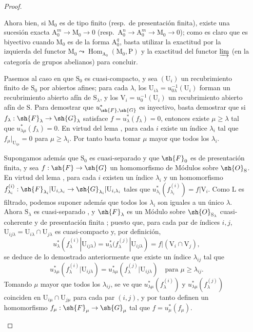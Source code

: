 \begin{proof}
\begin{enumerate}[label=(\roman*)]
Ahora bien, si $\mathrm{M}_0$ es de tipo finito (resp.\ de presentación finita), existe una sucesión exacta $\mathrm{A}_0^m\to\mathrm{M}_0\to 0$ (resp.\ $\mathrm{A}_0^n\to\mathrm{A}_0^m\to\mathrm{M}_0\to 0$); como es claro que  es biyectivo cuando $\mathrm{M}_0$ es de la forma $\mathrm{A}_0^q$, basta utilizar la exactitud por la izquierda del functor $\mathrm{M}_0\leadsto\operatorname{Hom}_{\mathrm{A}_0}(\mathrm{M}_0,\mathrm{P})$ y la exactitud del functor $\varinjlim$ (en la categoría de grupos abelianos) para concluir.

\medskip
Pasemos al caso en que $\mathrm{S}_0$ es cuasi-compacto, y sea $(\mathrm{U}_i)$ un recubrimiento finito de $\mathrm{S}_0$ por abiertos afines; para cada $\lambda$, los $\mathrm{U}_{i\lambda}=u_{0\lambda}^{-1}(\mathrm{U}_i)$ forman un recubrimiento abierto afín de $\mathrm{S}_\lambda$, y los $\mathrm{V}_i=u_0^{-1}(\mathrm{U}_i)$ un recubrimiento abierto afín de $\mathrm{S}$.
Para demostrar que $u_{\sh{F},\sh{G}}^*$ es inyectivo, basta demostrar que si $f_\lambda:\sh{F}_\lambda\to\sh{G}_\lambda$ satisface $f=u_\lambda^*(f_\lambda)=0$, entonces existe $\mu\geqslant\lambda$ tal que $u_{\lambda\mu}^*(f_\lambda)=0$.
En virtud del lema , para cada $i$ existe un índice $\lambda_i$ tal que $f_\mu|_{\mathrm{U}_{i\mu}}=0$ para $\mu\geqslant\lambda_i$.
Por tanto basta tomar $\mu$ mayor que todos los $\lambda_i$.

Supongamos además que $\mathrm{S}_0$ es cuasi-separado y que $\sh{F}_0$ es de presentación finita, y sea $f:\sh{F}\to\sh{G}$ un homomorfismo de Módulos sobre $\sh{O}_\mathrm{S}$.
En virtud del lema , para cada $i$ existen un índice $\lambda_i$ y un homomorfismo $f_{\lambda_i}^{(i)}:\sh{F}_{\lambda_i}|\mathrm{U}_{i,\lambda_i}\to\sh{G}_{\lambda_i}|\mathrm{U}_{i,\lambda_i}$ tales que $u_{\lambda_i}^*(f_{\lambda_i}^{(i)})=f|\mathrm{V}_i$.
Como $\mathrm{L}$ es filtrado, podemos suponer además que todos los $\lambda_i$ son iguales a un único $\lambda$.
Ahora $\mathrm{S}_\lambda$ es cuasi-separado , y $\sh{F}_\lambda$ es un Módulo sobre $\sh{O}_{\mathrm{S}_\lambda}$ cuasi-coherente y de presentación finita ; puesto que, para cada par de índices $i,j$, $\mathrm{U}_{ij\lambda}=\mathrm{U}_{i\lambda}\cap\mathrm{U}_{j\lambda}$ es cuasi-compacto y, por definición,
\[
  u_\lambda^*(f_\lambda^{(i)}|\mathrm{U}_{ij\lambda})=u_\lambda^*(f_\lambda^{(j)}|\mathrm{U}_{ij\lambda})=f|(\mathrm{V}_i\cap\mathrm{V}_j),
\]
se deduce de lo demostrado anteriormente que existe un índice $\lambda_{ij}$ tal que
\[
  u_{\lambda\mu}^*(f_\lambda^{(i)}|\mathrm{U}_{ij\lambda})=u_{\lambda\mu}^*(f_\lambda^{(j)}|\mathrm{U}_{ij\lambda})\quad\text{para }\mu\geqslant\lambda_{ij}.
\]
Tomando $\mu$ mayor que todos los $\lambda_{ij}$, se ve que $u_{\lambda\mu}^*(f_\lambda^{(i)})$ y $u_{\lambda\mu}^*(f_\lambda^{(j)})$ coinciden en $\mathrm{U}_{i\mu}\cap\mathrm{U}_{j\mu}$ para cada par $(i,j)$, y por tanto definen un homomorfismo $f_\mu:\sh{F}_\mu\to\sh{G}_\mu$ tal que $f=u_\mu^*(f_\mu)$.

\end{enumerate}
\end{proof}

